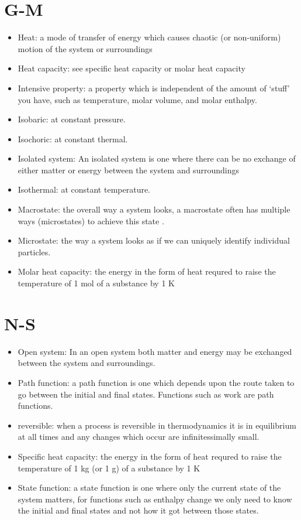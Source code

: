\documentclass[
]{book}
\begin{document}
\hypertarget{g-m}{%
\section*{G-M}\label{g-m}}

\begin{itemize}
\item
  Heat: a mode of transfer of energy which causes chaotic (or non-uniform) motion of the system or surroundings
\item
  Heat capacity: see specific heat capacity or molar heat capacity
\item
  Intensive property: a property which is independent of the amount of `stuff' you have, such as temperature, molar volume, and molar enthalpy.
\item
  Isobaric: at constant pressure.
\item
  Isochoric: at constant thermal.
\item
  Isolated system: An isolated system is one where there can be no exchange of either matter or energy between the system and surroundings
\item
  Isothermal: at constant temperature.
\item
  Macrostate: the overall way a system looks, a macrostate often has multiple ways (microstates) to achieve this state .
\item
  Microstate: the way a system looks as if we can uniquely identify individual particles.
\item
  Molar heat capacity: the energy in the form of heat requred to raise the temperature of 1 mol of a substance by 1 K
\end{itemize}

\hypertarget{n-s}{%
\section*{N-S}\label{n-s}}

\begin{itemize}
\item
  Open system: In an open system both matter and energy may be exchanged between the system and surroundings.
\item
  Path function: a path function is one which depends upon the route taken to go between the initial and final states. Functions such as work are path functions.
\item
  reversible: when a process is reversible in thermodynamics it is in equilibrium at all times and any changes which occur are infinitessimally small.
\item
  Specific heat capacity: the energy in the form of heat requred to raise the temperature of 1 kg (or 1 g) of a substance by 1 K
\item
  State function: a state function is one where only the current state of the system matters, for functions such as enthalpy change we only need to know the initial and final states and not how it got between those states.
\end{itemize}
\end{document}
